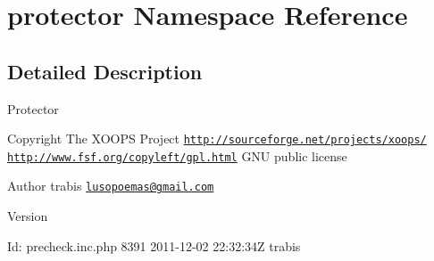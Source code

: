 \hypertarget{namespaceprotector}{\section{protector Namespace Reference}
\label{namespaceprotector}
}


\subsection{Detailed Description}
Protector

\begin{DoxyCopyright}{Copyright}
The X\-O\-O\-P\-S Project \href{http://sourceforge.net/projects/xoops/}{\tt http\-://sourceforge.\-net/projects/xoops/}  \href{http://www.fsf.org/copyleft/gpl.html}{\tt http\-://www.\-fsf.\-org/copyleft/gpl.\-html} G\-N\-U public license
\end{DoxyCopyright}
\begin{DoxyAuthor}{Author}
trabis \href{mailto:lusopoemas@gmail.com}{\tt lusopoemas@gmail.\-com} 
\end{DoxyAuthor}
\begin{DoxyVersion}{Version}

\end{DoxyVersion}
\begin{DoxyParagraph}{Id\-:}
precheck.\-inc.\-php 8391 2011-\/12-\/02 22\-:32\-:34\-Z trabis 
\end{DoxyParagraph}
